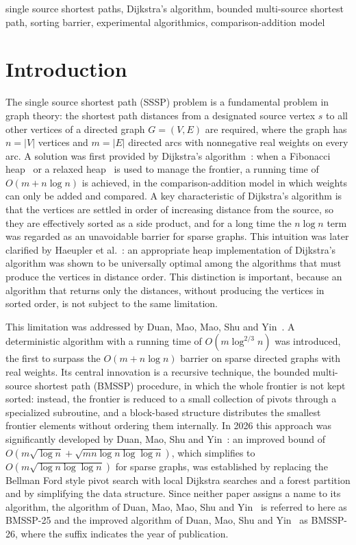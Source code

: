 \documentclass[conference,a4paper]{IEEEtran}
\newcommand{\bmA}{BMSSP-25}
\newcommand{\bmB}{BMSSP-26}
\newcommand{\Oh}{O}
\begin{document}
\begin{IEEEkeywords}
single source shortest paths, Dijkstra's algorithm, bounded multi-source shortest path, sorting
barrier, experimental algorithmics, comparison-addition model
\end{IEEEkeywords}

\section{Introduction}
The single source shortest path (SSSP) problem is a fundamental problem in graph theory: the
shortest path distances from a designated source vertex $s$ to all other vertices of a directed
graph $G=(V,E)$ are required, where the graph has $n=|V|$ vertices and $m=|E|$ directed arcs with
nonnegative real weights on every arc. A solution was first provided by Dijkstra's
algorithm~\cite{dijkstra1959}: when a Fibonacci heap~\cite{fredman1987} or a relaxed
heap~\cite{driscoll1988} is used to manage the frontier, a running time of $\Oh(m+n\log n)$ is
achieved, in the comparison-addition model in which weights can only be added and compared. A key
characteristic of Dijkstra's algorithm is that the vertices are settled in order of increasing
distance from the source, so they are effectively sorted as a side product, and for a long time
the $n\log n$ term was regarded as an unavoidable barrier for sparse graphs. This intuition was
later clarified by Haeupler et al.~\cite{haeupler2024}: an appropriate heap implementation of
Dijkstra's algorithm was shown to be universally optimal among the algorithms that must produce
the vertices in distance order. This distinction is important, because an algorithm that returns
only the distances, without producing the vertices in sorted order, is not subject to the same
limitation.

This limitation was addressed by Duan, Mao, Mao, Shu and Yin~\cite{duan2025}. A deterministic
algorithm with a running time of $\Oh(m\log^{2/3}n)$ was introduced, the first to surpass the
$\Oh(m+n\log n)$ barrier on sparse directed graphs with real weights. Its central innovation is a
recursive technique, the bounded multi-source shortest path (BMSSP) procedure, in which the whole
frontier is not kept sorted: instead, the frontier is reduced to a small collection of pivots
through a specialized subroutine, and a block-based structure distributes the smallest frontier
elements without ordering them internally. In 2026 this approach was significantly developed by
Duan, Mao, Shu and Yin~\cite{duan2026}: an improved bound of $\Oh(m\sqrt{\log n}+\sqrt{mn\log n
\log\log n})$, which simplifies to $\Oh(m\sqrt{\log n\log\log n})$ for sparse graphs, was
established by replacing the Bellman Ford style pivot search with local Dijkstra searches and a
forest partition and by simplifying the data structure. Since neither paper assigns a name to its
algorithm, the algorithm of Duan, Mao, Mao, Shu and Yin~\cite{duan2025} is referred to here as
\bmA{} and the improved algorithm of Duan, Mao, Shu and Yin~\cite{duan2026} as \bmB{}, where the
suffix indicates the year of publication.
\end{document}
